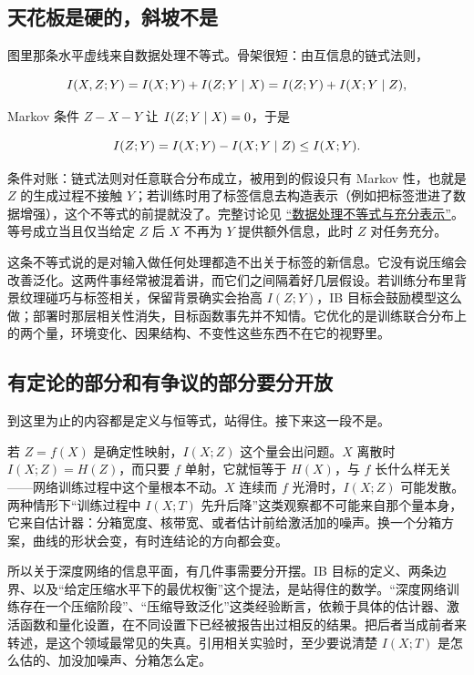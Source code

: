 \subsection{天花板是硬的，斜坡不是}

图里那条水平虚线来自数据处理不等式。骨架很短：由互信息的链式法则，

\[
I(X,Z;Y)=I(X;Y)+I(Z;Y\mid X)=I(Z;Y)+I(X;Y\mid Z),
\]

Markov 条件 \(Z-X-Y\) 让 \(I(Z;Y\mid X)=0\)，于是

\[
I(Z;Y)=I(X;Y)-I(X;Y\mid Z)\le I(X;Y).
\]

条件对账：链式法则对任意联合分布成立，被用到的假设只有 Markov 性，也就是 \(Z\) 的生成过程不接触 \(Y\)；若训练时用了标签信息去构造表示（例如把标签泄进了数据增强），这个不等式的前提就没了。完整讨论见 \hyperref[sec:07-Information-Theory/02-Joint-Information/04]{``数据处理不等式与充分表示''}。等号成立当且仅当给定 \(Z\) 后 \(X\) 不再为 \(Y\) 提供额外信息，此时 \(Z\) 对任务充分。

这条不等式说的是对输入做任何处理都造不出关于标签的新信息。它没有说压缩会改善泛化。这两件事经常被混着讲，而它们之间隔着好几层假设。若训练分布里背景纹理碰巧与标签相关，保留背景确实会抬高 \(I(Z;Y)\)，IB 目标会鼓励模型这么做；部署时那层相关性消失，目标函数事先并不知情。它优化的是训练联合分布上的两个量，环境变化、因果结构、不变性这些东西不在它的视野里。

\subsection{有定论的部分和有争议的部分要分开放}

到这里为止的内容都是定义与恒等式，站得住。接下来这一段不是。

若 \(Z=f(X)\) 是确定性映射，\(I(X;Z)\) 这个量会出问题。\(X\) 离散时 \(I(X;Z)=H(Z)\)，而只要 \(f\) 单射，它就恒等于 \(H(X)\)，与 \(f\) 长什么样无关——网络训练过程中这个量根本不动。\(X\) 连续而 \(f\) 光滑时，\(I(X;Z)\) 可能发散。两种情形下``训练过程中 \(I(X;T)\) 先升后降''这类观察都不可能来自那个量本身，它来自估计器：分箱宽度、核带宽、或者估计前给激活加的噪声。换一个分箱方案，曲线的形状会变，有时连结论的方向都会变。

所以关于深度网络的信息平面，有几件事需要分开摆。IB 目标的定义、两条边界、以及``给定压缩水平下的最优权衡''这个提法，是站得住的数学。``深度网络训练存在一个压缩阶段''、``压缩导致泛化''这类经验断言，依赖于具体的估计器、激活函数和量化设置，在不同设置下已经被报告出过相反的结果。把后者当成前者来转述，是这个领域最常见的失真。引用相关实验时，至少要说清楚 \(I(X;T)\) 是怎么估的、加没加噪声、分箱怎么定。


